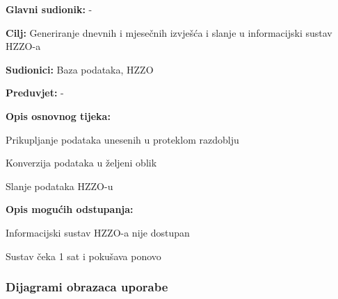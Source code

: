 					\noindent {}
					\begin{packed_item}
	
						\item \textbf{Glavni sudionik: } -
						\item  \textbf{Cilj:} Generiranje dnevnih i mjesečnih izvješća i slanje u informacijski sustav HZZO-a
						\item  \textbf{Sudionici:} Baza podataka, HZZO
						\item  \textbf{Preduvjet:} -
						\item  \textbf{Opis osnovnog tijeka:}
						
						\item[] \begin{packed_enum}
	
							\item Prikupljanje podataka unesenih u proteklom razdoblju
							\item Konverzija podataka u željeni oblik
							\item Slanje podataka HZZO-u
							
						\end{packed_enum}
						
						\item  \textbf{Opis mogućih odstupanja:}
						\item[] \begin{packed_item}
						
							\item[2.a] Informacijski sustav HZZO-a nije dostupan
							\item[] \begin{packed_enum}
								
								\item Sustav čeka 1 sat i pokušava ponovo
								
							\end{packed_enum}
						\end{packed_item}
					\end{packed_item}
					
					
				\newpage
					
				\subsubsection{Dijagrami obrazaca uporabe}
							
